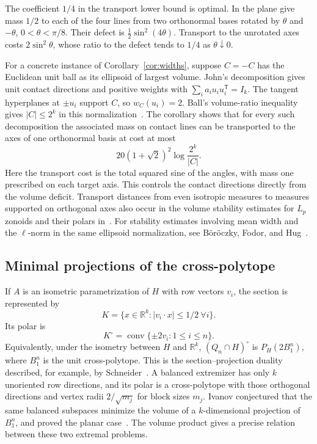 \documentclass[11pt,a4paper]{article}
\theoremstyle{remark}\newtheorem{remark}[theorem]{Remark}
\numberwithin{equation}{section}
\begin{document}
The coefficient \(1/4\) in the transport lower bound is optimal.
In the plane give mass \(1/2\) to each of the four lines from two
orthonormal bases rotated by \(\theta\) and \(-\theta\),
\(0<\theta<\pi/8\). Their defect is \(\tfrac12\sin^2(4\theta)\).
Transport to the unrotated axes costs \(2\sin^2\theta\), whose ratio
to the defect tends to \(1/4\) as \(\theta\downarrow0\).

For a concrete instance of Corollary~\ref{cor:widths}, suppose
\(C=-C\) has the Euclidean unit ball as its ellipsoid of largest
volume. John's decomposition gives unit contact directions and
positive weights with \(\sum_i a_i u_i u_i^{\mathsf T}=I_k\).
The tangent hyperplanes at \(\pm u_i\) support \(C\), so
\(w_C(u_i)=2\). Ball's volume-ratio inequality gives
\(|C|\le2^k\) in this normalization~\cite{Ball1991}. The corollary
shows that for every such decomposition the associated mass on contact
lines can be transported to the axes of one orthonormal basis at cost
at most
\[
 20(1+\sqrt2)^2\log\frac{2^k}{|C|}.
\]
Here the transport cost is the total squared sine of the angles, with
mass one prescribed on each target axis. This controls the contact directions directly from the volume deficit.
Transport distances from even isotropic measures to measures supported
on orthogonal axes also occur in the volume stability estimates for
\(L_p\) zonoids and their polars in~\cite{BFH2019}. For stability estimates
involving mean width and the \(\ell\)-norm in the same ellipsoid
normalization, see B\"or\"oczky, Fodor, and Hug~\cite{BFH2025}.

\subsection{Minimal projections of the cross-polytope}

If $A$ is an isometric parametrization of $H$ with row vectors $v_i$,
the section is represented by
\[
 K=\{x\in\mathbb R^k:|v_i\cdot x|\le1/2\ \forall i\}.
\]
Its polar is
\[
 K^\circ=\operatorname{conv}\{\pm2v_i:1\le i\le n\}.
\]
Equivalently, under the isometry between $H$ and $\mathbb R^k$,
$(Q_n\cap H)^\circ$ is $P_H(2B_1^n)$, where $B_1^n$ is the unit
cross-polytope. This is the section--projection duality described, for example,
by Schneider~\cite{Schneider}. A balanced extremizer has only $k$
unoriented row directions, and its polar is a cross-polytope with those
orthogonal directions and vertex radii $2/\sqrt{m_j}$ for block sizes $m_j$.
Ivanov conjectured that the same balanced subspaces minimize the
volume of a \(k\)-dimensional projection of \(B_1^n\), and proved
the planar case~\cite{Ivanov2021Cross}. The volume product gives a
precise relation between these two extremal problems.
\end{document}
